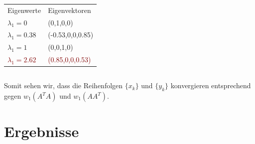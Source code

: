 \documentclass[hyperref={pdfpagelabels=false}]{beamer}
\begin{document}
\begin{frame}
\begin{minipage}[0.2\textheight]{\textwidth}
\begin{columns}[T]
\begin{column}{0.4\textwidth}
		\begin{tabular}{l l}
			Eigenwerte & Eigenvektoren \\
			$\lambda_1 = 0$ & (0,1,0,0) \\ 
			$\lambda_1 = 0.38$ & (-0.53,0,0,0.85)\\
			$\lambda_1 = 1$ & (0,0,1,0) \\
			\textcolor{maroon}{$\lambda_1 = 2.62$} & \textcolor{maroon}{(0.85,0,0,0.53)} \\
		\end{tabular}
	\end{column}
	\end{columns}
\end{minipage}

Somit sehen wir, dass die Reihenfolgen $\{x_k\}$ und $\{y_k\}$ konvergieren entsprechend gegen $w_1(A^TA)$ und $w_1(AA^T)$.

\end{frame}
\section{Ergebnisse} 
\end{document}
